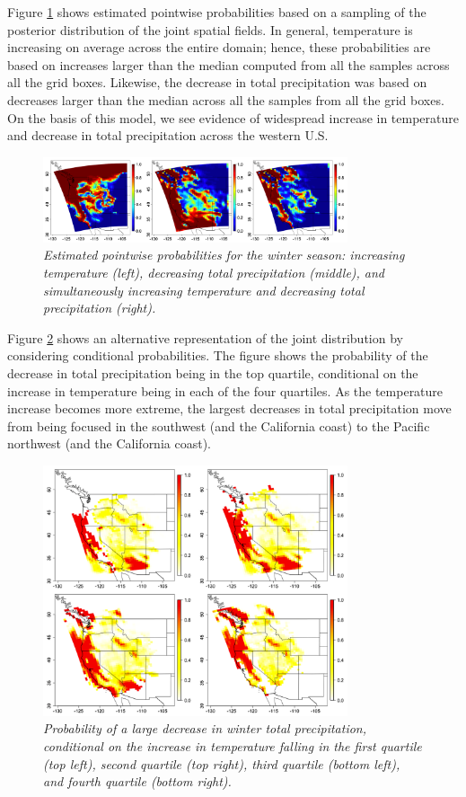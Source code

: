 \documentclass[12pt]{amsart}
\begin{document}
Figure \ref{fig: Fig7} shows estimated pointwise probabilities based on a sampling of the posterior distribution of the joint spatial fields. In general, temperature is increasing on average across the entire domain; hence, these probabilities are based on increases larger than the median computed from all the samples across all the grid boxes. Likewise, the decrease in total precipitation was based on decreases larger than the median across all the samples from all the grid boxes. On the basis of this model, we see evidence of widespread increase in temperature and decrease in total precipitation across the western U.S.

\begin{figure}[H]
    \centering
    \includegraphics[width = 0.8\textwidth]{Fig7.png}
    \caption{\emph{Estimated pointwise probabilities for the winter season: increasing temperature (left), decreasing total precipitation (middle), and simultaneously increasing temperature and decreasing total precipitation (right).}}
    \label{fig: Fig7}
\end{figure}

Figure \ref{fig: Fig8} shows an alternative representation of the joint distribution by considering conditional probabilities. The figure shows the probability of the decrease in total precipitation being in the top quartile, conditional on the increase in temperature being in each of the four quartiles. As the temperature increase becomes more extreme, the largest decreases in total precipitation move from being focused in the southwest (and the California coast) to the Pacific northwest (and the California coast). 

\begin{figure}[H]
    \centering
    \includegraphics[width = 0.8\textwidth]{Fig8.png}
    \caption{\emph{Probability of a large decrease in winter total precipitation, conditional on the increase in temperature falling in the first quartile (top left), second quartile (top right), third quartile (bottom left), and fourth quartile (bottom right).}}
    \label{fig: Fig8}
\end{figure}
\end{document}
